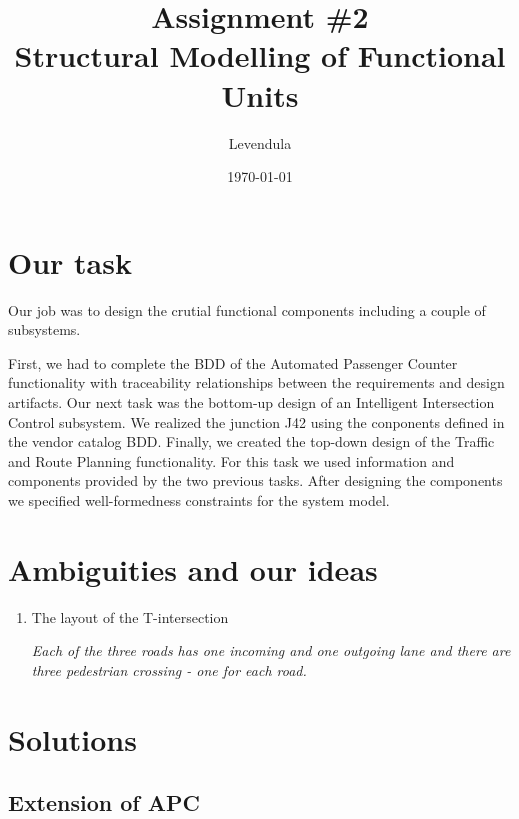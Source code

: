 \documentclass[a4paper]{article}
\title{Assignment \#2 \\ Structural Modelling of Functional Units}
\author{Levendula}
\date{\today}
\begin{document}


\tableofcontents
\listoffigures
\clearpage

\section{Our task}

Our job was to design the crutial functional components including a couple of subsystems.

First, we had to complete the BDD of the {Automated Passenger Counter} functionality with traceability relationships between the requirements and design artifacts. Our next task was the bottom-up design of an {Intelligent Intersection Control} subsystem. We realized the junction J42 using the conponents defined in the vendor catalog BDD. Finally, we created the top-down design of the {Traffic and Route Planning} functionality. For this task we used information and components provided by the two previous tasks. After designing the components we specified well-formedness constraints for the system model.
\section{Ambiguities and our ideas}

\begin{enumerate}
	\item The layout of the T-intersection
		
		\textit{Each of the three roads has one incoming and one outgoing lane and there are three pedestrian crossing - one for each road.}
	
\end{enumerate}

\section{Solutions}

\subsection{Extension of APC}


\end{document}
